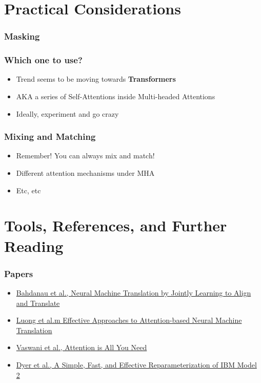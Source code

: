 \documentclass[usenames,dvipsnames]{beamer}
\begin{document}
\section{Practical Considerations}
\begin{frame}
\frametitle{Masking}

\end{frame}

\begin{frame}
\frametitle{Which one to use?}
\begin{itemize}
  \item Trend seems to be moving towards \textbf{Transformers}
  \item AKA a series of Self-Attentions inside Multi-headed Attentions
  \item Ideally, experiment and go crazy
\end{itemize}
\end{frame}

\begin{frame}
\frametitle{Mixing and Matching}
  \begin{itemize}
    \item Remember! You can always mix and match!
    \item Different attention mechanisms under MHA
    \item Etc, etc
  \end{itemize}
\end{frame}


\section{Tools, References, and Further Reading}


\begin{frame}
\frametitle{Papers}
  \begin{itemize}
    \item \href{https://arxiv.org/pdf/1409.0473}{Bahdanau et al., Neural Machine Translation by Jointly Learning to Align and Translate}
    \item \href{https://arxiv.org/pdf/1508.04025}{Luong et al.m Effective Approaches to Attention-based Neural Machine Translation}
    \item \href{https://papers.nips.cc/paper/7181-attention-is-all-you-need.pdf}{Vaswani et al., Attention is All You Need}
    \item \href{http://www.aclweb.org/anthology/N13-1073}{Dyer et al., A Simple, Fast, and Effective Reparameterization of IBM Model 2}
  \end{itemize}
\end{frame}


\end{document}
